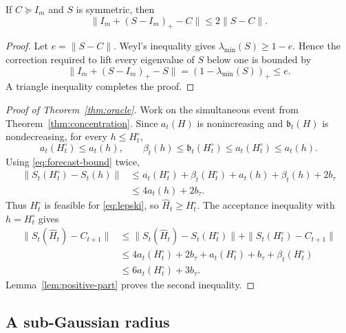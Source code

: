 \begin{lemma}
\label{lem:positive-part}
If $C\succeq I_m$ and $S$ is symmetric, then
\begin{equation}
 \|I_m+(S-I_m)_+-C\|\le 2\|S-C\|.
\end{equation}
\end{lemma}

\begin{proof}
Let $e=\|S-C\|$.  Weyl's inequality gives $\lambda_{\min}(S)\ge1-e$.  Hence the correction required to lift every eigenvalue of $S$ below one is bounded by
\begin{equation}
 \|I_m+(S-I_m)_+-S\|=(1-\lambda_{\min}(S))_+\le e.
\end{equation}
A triangle inequality completes the proof.
\end{proof}

\begin{proof}[Proof of Theorem~\ref{thm:oracle}]
Work on the simultaneous event from Theorem~\ref{thm:concentration}.  Since $a_t(H)$ is nonincreasing and $\mathfrak b_t(H)$ is nondecreasing, for every $h\le H_t^\circ$,
\begin{equation}
 a_t(H_t^\circ)\le a_t(h),\qquad
 \beta_t(h)\le\mathfrak b_t(H_t^\circ)\le a_t(H_t^\circ)\le a_t(h).
\end{equation}
Using \eqref{eq:forecast-bound} twice,
\begin{align}
 \|S_t(H_t^\circ)-S_t(h)\|
 &\le a_t(H_t^\circ)+\beta_t(H_t^\circ)+a_t(h)+\beta_t(h)+2b_\tau\\
 &\le4a_t(h)+2b_\tau.
\end{align}
Thus $H_t^\circ$ is feasible for \eqref{eq:lepski}, so $\widehat H_t\ge H_t^\circ$.  The acceptance inequality with $h=H_t^\circ$ gives
\begin{align}
 \|S_t(\widehat H_t)-C_{t+1}\|
 &\le\|S_t(\widehat H_t)-S_t(H_t^\circ)\|
      +\|S_t(H_t^\circ)-C_{t+1}\|\\
 &\le4a_t(H_t^\circ)+2b_\tau
      +a_t(H_t^\circ)+b_\tau+\beta_t(H_t^\circ)\\
 &\le6a_t(H_t^\circ)+3b_\tau.
\end{align}
Lemma~\ref{lem:positive-part} proves the second inequality.
\end{proof}

\subsection{A sub-Gaussian radius}
\label{app:radius}

